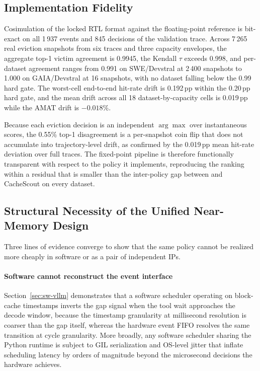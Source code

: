 \subsection{Implementation Fidelity}
\label{sec:hw-fid}

Cosimulation of the locked RTL format against the floating-point
reference is bit-exact on all 1\,937 events and 845 decisions of the
validation trace. Across 7\,265 real eviction snapshots from six traces and
three capacity envelopes, the aggregate top-1 victim agreement is
0.9945, the Kendall $\tau$ exceeds 0.998, and per-dataset agreement
ranges from 0.991 on SWE/Devstral at 2\,400 snapshots to 1.000 on
GAIA/Devstral at 16 snapshots, with no dataset falling below the 0.99
hard gate. The worst-cell end-to-end hit-rate drift is 0.192\,pp
within the 0.20\,pp hard gate, and the mean drift across all 18
dataset-by-capacity cells is 0.019\,pp while the AMAT drift is
$-0.018$\%.

Because each eviction decision is an independent $\arg\max$ over
instantaneous scores, the 0.55\% top-1 disagreement is a per-snapshot
coin flip that does not accumulate into trajectory-level drift, as
confirmed by the 0.019\,pp mean hit-rate deviation over full traces.
The fixed-point pipeline is therefore functionally transparent with
respect to the policy it implements, reproducing the ranking within a
residual that is smaller than the inter-policy gap between \unison and
CacheScout on every dataset.

\subsection{Structural Necessity of the Unified Near-Memory Design}
\label{sec:hw-nec}

Three lines of evidence converge to show that the same policy cannot be
realized more cheaply in software or as a pair of independent IPs.

\paragraph{Software cannot reconstruct the event interface}
Section~\ref{sec:sw-vllm} demonstrates that a software scheduler
operating on block-cache timestamps inverts the gap signal when the
tool wait approaches the decode window, because the timestamp
granularity at millisecond resolution is coarser than the gap itself,
whereas the hardware event FIFO resolves the same transition at cycle
granularity. More broadly, any software scheduler sharing the Python
runtime is subject to GIL serialization and OS-level jitter that
inflate scheduling latency by orders of magnitude beyond the
microsecond decisions the hardware achieves.

